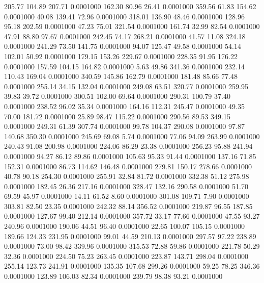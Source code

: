  205.77  104.89  207.71   0.0001000
 162.30   80.96   26.41   0.0001000
 359.56   61.83  154.62   0.0001000
  40.08  139.41   72.96   0.0001000
 318.01  136.90   48.46   0.0001000
 128.96   95.18  202.59   0.0001000
  47.23   75.01  321.54   0.0001000
 161.74   32.99   82.54   0.0001000
  47.91   88.80   97.67   0.0001000
 242.45   74.17  268.21   0.0001000
  41.57   11.08  324.18   0.0001000
 241.29   73.50  141.75   0.0001000
  94.07  125.47   49.58   0.0001000
  54.14  102.01   50.92   0.0001000
 179.15  153.26  229.67   0.0001000
 228.35   91.95  176.22   0.0001000
 157.59  104.15  164.82   0.0001000
   5.63   49.86  341.36   0.0001000
 232.14  110.43  169.04   0.0001000
 340.59  145.86  162.79   0.0001000
 181.48   85.66   77.48   0.0001000
 255.14   34.15  132.04   0.0001000
 249.08   63.51  320.77   0.0001000
 259.95   39.83   39.72   0.0001000
 300.51  102.00   69.64   0.0001000
 290.31  100.79   37.40   0.0001000
 238.52   96.02   35.34   0.0001000
 164.16  112.31  245.47   0.0001000
  49.35   70.00  181.72   0.0001000
  25.89   98.47  115.22   0.0001000
 290.56   89.53  349.15   0.0001000
 249.31   61.39  307.74   0.0001000
  99.78  104.37  290.08   0.0001000
  97.87  140.68  350.30   0.0001000
 245.69   69.08    5.74   0.0001000
  77.06   94.09  263.99   0.0001000
 240.43   91.08  200.98   0.0001000
 224.06   86.29   23.38   0.0001000
 256.23   95.88  241.94   0.0001000
  94.27   86.12   89.86   0.0001000
 105.63   95.33   91.44   0.0001000
 137.16   71.85  152.31   0.0001000
  86.73  114.62  146.48   0.0001000
 279.81  150.17  278.66   0.0001000
  40.78   90.18  254.30   0.0001000
 255.91   32.84   81.72   0.0001000
 332.38   51.12  275.98   0.0001000
 182.45   26.36  217.16   0.0001000
 328.47  132.16  290.58   0.0001000
  51.70   69.59   45.97   0.0001000
  14.11   61.52    8.60   0.0001000
 301.08  109.71    7.90   0.0001000
 303.81   82.50   23.35   0.0001000
 242.32   88.14  356.52   0.0001000
 219.87   96.55  187.85   0.0001000
 127.67   99.40  212.14   0.0001000
 357.72   33.17   77.66   0.0001000
  47.55   93.27  240.96   0.0001000
 190.06   44.51   96.40   0.0001000
  22.65  100.07  105.15   0.0001000
 189.66  124.33  231.95   0.0001000
  99.01   44.59  210.13   0.0001000
 297.57   97.22  238.89   0.0001000
  73.00   98.42  339.96   0.0001000
 315.53   72.88   59.86   0.0001000
 221.78   50.29   32.36   0.0001000
 224.50   75.23  263.45   0.0001000
 223.87  143.71  298.04   0.0001000
 255.14  123.73  241.91   0.0001000
 135.35  107.68  299.26   0.0001000
  59.25   78.25  346.36   0.0001000
 123.89  106.03   82.34   0.0001000
 239.79   98.38   93.21   0.0001000
